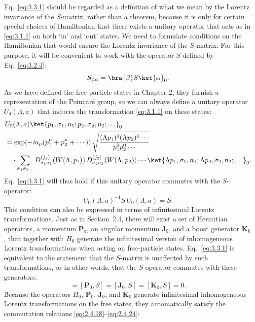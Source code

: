 Eq.~\eqref{eq:3.3.1} should be regarded as a definition of what we mean by the Lorentz
invariance of the $S$-matrix, rather than a theorem, because it is only for certain
special choices of Hamiltonian that there exists a unitary operator that acts as
in \eqref{eq:3.1.1} on both `in' and `out' states. We need to formulate conditions on the
Hamiltonian that would ensure the Lorentz invariance of the $S$-matrix. For this
purpose, it will be convenient to work with the operator $S$ defined by
Eq.~\eqref{eq:3.2.4}:
\[
S_{\beta\alpha}=\bra{\beta}S\ket{\alpha}_0.
\]
As we have defined the free-particle states in Chapter 2, they furnish a
representation of the Poincar\'e group, so we can always define a
unitary operator $U_0(\Lambda,a)$ that induces the transformation \eqref{eq:3.1.1} on
these states:
\begin{align*}
&U_0(\Lambda,a)\ket{p_1,\sigma_1,n_1;p_2,\sigma_2,n_2;\ldots}_0
\nonumber\\
&=\exp\!\left(-ia_\mu(p_1^\mu+p_2^\mu+\cdots)\right)
\sqrt{\frac{(\Lambda p_1)^0(\Lambda p_2)^0\cdots}{p_1^0p_2^0\cdots}}
\nonumber\\
&\quad\cdot\sum_{\bar\sigma_1\bar\sigma_2\ldots}
D^{(j_1)}_{\bar\sigma_1\sigma_1}\!\left(W(\Lambda,p_1)\right)
D^{(j_2)}_{\bar\sigma_2\sigma_2}\!\left(W(\Lambda,p_2)\right)\cdots
\ket{\Lambda p_1,\bar\sigma_1,n_1;\Lambda p_2,\bar\sigma_2,n_2;\ldots}_0.
\end{align*}
Eq.~\eqref{eq:3.3.1} will thus hold if this unitary operator commutes with the
$S$-operator:
\[
U_0(\Lambda,a)^{-1}S\,U_0(\Lambda,a)=S.
\]
This condition can also be expressed in terms of infinitesimal Lorentz
transformations. Just as in Section~2.4, there will exist a set of Hermitian
operators, a momentum $\mathbf{P}_0$, an angular momentum $\mathbf{J}_0$, and a
boost generator $\mathbf{K}_0$, that together with $H_0$ generate the infinitesimal
version of inhomogeneous Lorentz transformations when acting on free-particle
states. Eq.~\eqref{eq:3.3.1} is equivalent to the statement that the $S$-matrix is
unaffected by such transformations, or in other words, that the $S$-operator
commutes with these generators:
\begin{equation}
[H_0,S]=[\mathbf{P}_0,S]=[\mathbf{J}_0,S]=[\mathbf{K}_0,S]=0.
\tag{3.3.3}\label{eq:3.3.3}
\end{equation}
Because the operators $H_0$, $\mathbf{P}_0$, $\mathbf{J}_0$, and $\mathbf{K}_0$
generate infinitesimal inhomogeneous Lorentz transformations on the free states,
they automatically satisfy the commutation relations \eqref{eq:2.4.18}--\eqref{eq:2.4.24}:
